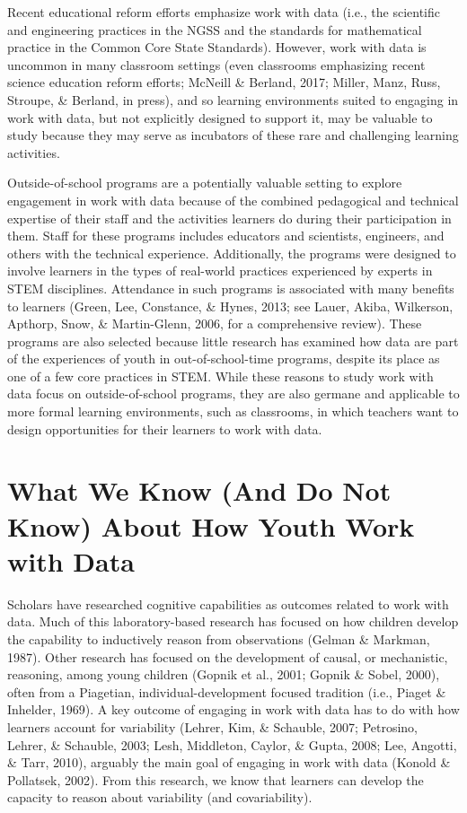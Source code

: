 \documentclass[]{book}
\theoremstyle{definition}
\theoremstyle{definition}
\theoremstyle{definition}
\theoremstyle{remark}
\begin{document}
Recent educational reform efforts emphasize work with data (i.e., the
scientific and engineering practices in the NGSS and the standards for
mathematical practice in the Common Core State Standards). However, work
with data is uncommon in many classroom settings (even classrooms
emphasizing recent science education reform efforts; McNeill \& Berland,
2017; Miller, Manz, Russ, Stroupe, \& Berland, in press), and so
learning environments suited to engaging in work with data, but not
explicitly designed to support it, may be valuable to study because they
may serve as incubators of these rare and challenging learning
activities.

Outside-of-school programs are a potentially valuable setting to explore
engagement in work with data because of the combined pedagogical and
technical expertise of their staff and the activities learners do during
their participation in them. Staff for these programs includes educators
and scientists, engineers, and others with the technical experience.
Additionally, the programs were designed to involve learners in the
types of real-world practices experienced by experts in STEM
disciplines. Attendance in such programs is associated with many
benefits to learners (Green, Lee, Constance, \& Hynes, 2013; see Lauer,
Akiba, Wilkerson, Apthorp, Snow, \& Martin-Glenn, 2006, for a
comprehensive review). These programs are also selected because little
research has examined how data are part of the experiences of youth in
out-of-school-time programs, despite its place as one of a few core
practices in STEM. While these reasons to study work with data focus on
outside-of-school programs, they are also germane and applicable to more
formal learning environments, such as classrooms, in which teachers want
to design opportunities for their learners to work with data.

\section{What We Know (And Do Not Know) About How Youth Work with
Data}\label{what-we-know-and-do-not-know-about-how-youth-work-with-data}

Scholars have researched cognitive capabilities as outcomes related to
work with data. Much of this laboratory-based research has focused on
how children develop the capability to inductively reason from
observations (Gelman \& Markman, 1987). Other research has focused on
the development of causal, or mechanistic, reasoning, among young
children (Gopnik et al., 2001; Gopnik \& Sobel, 2000), often from a
Piagetian, individual-development focused tradition (i.e., Piaget \&
Inhelder, 1969). A key outcome of engaging in work with data has to do
with how learners account for variability (Lehrer, Kim, \& Schauble,
2007; Petrosino, Lehrer, \& Schauble, 2003; Lesh, Middleton, Caylor, \&
Gupta, 2008; Lee, Angotti, \& Tarr, 2010), arguably the main goal of
engaging in work with data (Konold \& Pollatsek, 2002). From this
research, we know that learners can develop the capacity to reason about
variability (and covariability).
\end{document}
